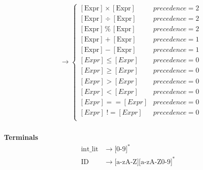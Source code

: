 \documentclass[11pt]{article}
\begin{document}
\begin{align*}
  [\text{BinaryExpr}] &\to 
  \begin{cases}
    [\text{Expr}] \times [\text{Expr}] & precedence = 2 \\
    [\text{Expr}] \div [\text{Expr}] & precedence = 2 \\
    [\text{Expr}] \,\%\, [\text{Expr}] & precedence = 2 \\
    [\text{Expr}] + [\text{Expr}] & precedence = 1 \\
    [\text{Expr}] - [\text{Expr}] & precedence = 1 \\
    [Expr] \le  [Expr] & precedence = 0 \\
    [Expr] \ge  [Expr] & precedence = 0 \\
    [Expr] >  [Expr] & precedence = 0 \\
    [Expr] <  [Expr] & precedence = 0 \\
    [Expr] ==  [Expr] & precedence = 0 \\
    [Expr] \; ! \!=  [Expr] & precedence = 0 \\
  \end{cases} \\
\end{align*}

\textbf{Terminals}
\begin{align*}
  \text{int\_lit} &\to \text{[0-9]}^* \\
  \text{ID} &\to \text{[a-zA-Z][a-zA-Z0-9]}^* \\
\end{align*}
\end{document}
